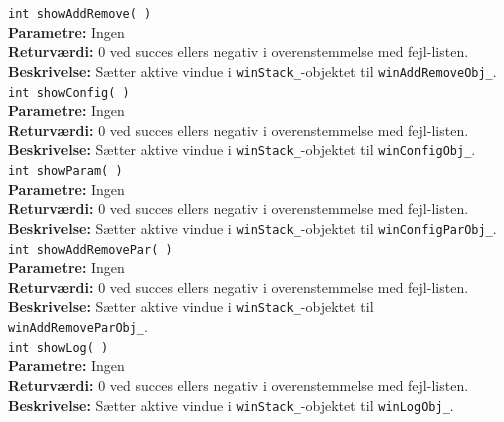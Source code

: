 \verb+int showAddRemove( )+\\
\textbf{Parametre:} Ingen \\
\textbf{Returværdi:} 0 ved succes ellers negativ i overenstemmelse med fejl-listen. \\
\textbf{Beskrivelse:} Sætter aktive vindue i \verb+winStack_+-objektet til \verb+winAddRemoveObj_+.\\

\verb+int showConfig( )+\\
\textbf{Parametre:} Ingen \\
\textbf{Returværdi:} 0 ved succes ellers negativ i overenstemmelse med fejl-listen. \\
\textbf{Beskrivelse:} Sætter aktive vindue i \verb+winStack_+-objektet til \verb+winConfigObj_+.\\

\verb+int showParam( )+\\
\textbf{Parametre:} Ingen \\
\textbf{Returværdi:} 0 ved succes ellers negativ i overenstemmelse med fejl-listen. \\
\textbf{Beskrivelse:} Sætter aktive vindue i \verb+winStack_+-objektet til \verb+winConfigParObj_+.\\

\verb+int showAddRemovePar( )+\\
\textbf{Parametre:} Ingen \\
\textbf{Returværdi:} 0 ved succes ellers negativ i overenstemmelse med fejl-listen. \\
\textbf{Beskrivelse:} Sætter aktive vindue i \verb+winStack_+-objektet til \verb+winAddRemoveParObj_+.\\

\verb+int showLog( )+\\
\textbf{Parametre:} Ingen \\
\textbf{Returværdi:} 0 ved succes ellers negativ i overenstemmelse med fejl-listen. \\
\textbf{Beskrivelse:} Sætter aktive vindue i \verb+winStack_+-objektet til \verb+winLogObj_+.\\

